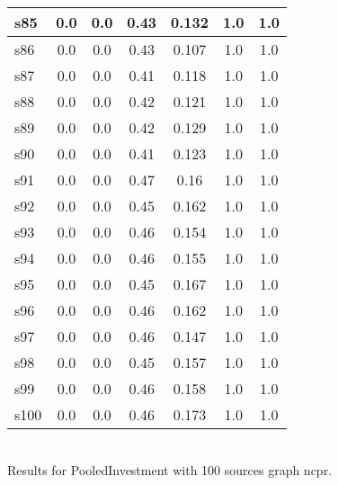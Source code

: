 \documentclass{article}
\begin{document}
\begin{tabular}{|l|c|c|c|c|c|c|}
\hline
s85 &0.0 & 0.0 & 0.43 & 0.132 & 1.0 & 1.0\\
\hline
s86 &0.0 & 0.0 & 0.43 & 0.107 & 1.0 & 1.0\\
\hline
s87 &0.0 & 0.0 & 0.41 & 0.118 & 1.0 & 1.0\\
\hline
s88 &0.0 & 0.0 & 0.42 & 0.121 & 1.0 & 1.0\\
\hline
s89 &0.0 & 0.0 & 0.42 & 0.129 & 1.0 & 1.0\\
\hline
s90 &0.0 & 0.0 & 0.41 & 0.123 & 1.0 & 1.0\\
\hline
s91 &0.0 & 0.0 & 0.47 & 0.16 & 1.0 & 1.0\\
\hline
s92 &0.0 & 0.0 & 0.45 & 0.162 & 1.0 & 1.0\\
\hline
s93 &0.0 & 0.0 & 0.46 & 0.154 & 1.0 & 1.0\\
\hline
s94 &0.0 & 0.0 & 0.46 & 0.155 & 1.0 & 1.0\\
\hline
s95 &0.0 & 0.0 & 0.45 & 0.167 & 1.0 & 1.0\\
\hline
s96 &0.0 & 0.0 & 0.46 & 0.162 & 1.0 & 1.0\\
\hline
s97 &0.0 & 0.0 & 0.46 & 0.147 & 1.0 & 1.0\\
\hline
s98 &0.0 & 0.0 & 0.45 & 0.157 & 1.0 & 1.0\\
\hline
s99 &0.0 & 0.0 & 0.46 & 0.158 & 1.0 & 1.0\\
\hline
s100 &0.0 & 0.0 & 0.46 & 0.173 & 1.0 & 1.0\\
\hline
\end{tabular}\\

\noindent Results for PooledInvestment with 100 sources graph ncpr.
\end{document}
